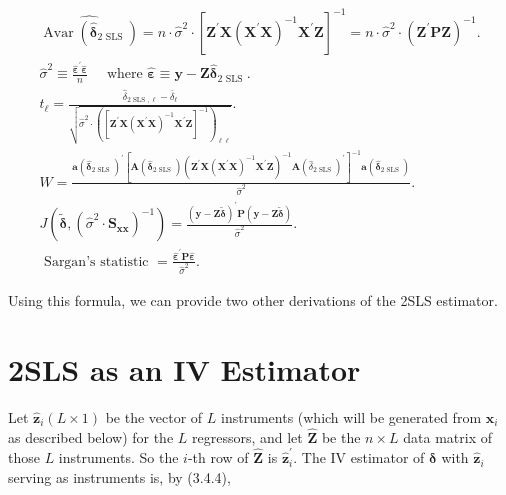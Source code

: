 \documentclass[10pt]{article}
\begin{document}
\begin{gather*}
\widehat{\operatorname{Avar}\left(\hat{\boldsymbol{\delta}}_{2 \text { SLS }}\right)}=n \cdot \hat{\sigma}^{2} \cdot\left[\mathbf{Z}^{\prime} \mathbf{X}\left(\mathbf{X}^{\prime} \mathbf{X}\right)^{-1} \mathbf{X}^{\prime} \mathbf{Z}\right]^{-1}=n \cdot \hat{\sigma}^{2} \cdot\left(\mathbf{Z}^{\prime} \mathbf{P} \mathbf{Z}\right)^{-1} .  \tag{3.8.5'}\\
\hat{\sigma}^{2} \equiv \frac{\hat{\boldsymbol{\varepsilon}}^{\prime} \hat{\boldsymbol{\varepsilon}}}{n} \quad \text { where } \hat{\boldsymbol{\varepsilon}} \equiv \mathbf{y}-\mathbf{Z} \hat{\boldsymbol{\delta}}_{2 \text { SLS }} .  \tag{$\prime$}\\
t_{\ell}=\frac{\hat{\delta}_{2 \text { SLS }, \ell}-\bar{\delta}_{\ell}}{\sqrt{\hat{\sigma}^{2} \cdot\left(\left[\mathbf{Z}^{\prime} \mathbf{X}\left(\mathbf{X}^{\prime} \mathbf{X}\right)^{-1} \mathbf{X}^{\prime} \mathbf{Z}\right]^{-1}\right)_{\ell \ell}}} .  \tag{$\prime$}\\
W=\frac{\mathbf{a}\left(\hat{\boldsymbol{\delta}}_{2 \text { SLS }}\right)^{\prime}\left[\mathbf{A}\left(\hat{\boldsymbol{\delta}}_{2 \text { SLS }}\right)\left(\mathbf{Z}^{\prime} \mathbf{X}\left(\mathbf{X}^{\prime} \mathbf{X}\right)^{-1} \mathbf{X}^{\prime} \mathbf{Z}\right)^{-1} \mathbf{A}\left(\hat{\delta}_{2 \text { SLS }}\right)^{\prime}\right]^{-1} \mathbf{a}\left(\hat{\boldsymbol{\delta}}_{2 \text { SLS }}\right)}{\hat{\sigma}^{2}} .  \tag{$\prime$}\\
J\left(\tilde{\boldsymbol{\delta}},\left(\hat{\sigma}^{2} \cdot \mathbf{S}_{\mathbf{x} \mathbf{x}}\right)^{-1}\right)=\frac{(\mathbf{y}-\mathbf{Z} \tilde{\boldsymbol{\delta}})^{\prime} \mathbf{P}(\mathbf{y}-\mathbf{Z} \tilde{\boldsymbol{\delta}})}{\hat{\sigma}^{2}} .  \tag{$\prime$}\\
\text { Sargan's statistic }=\frac{\hat{\boldsymbol{\varepsilon}}^{\prime} \mathbf{P} \hat{\boldsymbol{\varepsilon}}}{\hat{\sigma}^{2}} . \tag{3.8.10'}
\end{gather*}


Using this formula, we can provide two other derivations of the 2SLS estimator.

\section*{2SLS as an IV Estimator}
Let $\hat{\mathbf{z}}_{i}(L \times 1)$ be the vector of $L$ instruments (which will be generated from $\mathbf{x}_{i}$ as described below) for the $L$ regressors, and let $\widehat{\mathbf{Z}}$ be the $n \times L$ data matrix of those $L$ instruments. So the $i$-th row of $\widehat{\mathbf{Z}}$ is $\hat{\mathbf{z}}_{i}^{\prime}$. The IV estimator of $\boldsymbol{\delta}$ with $\hat{\mathbf{z}}_{i}$ serving as instruments is, by (3.4.4),
\end{document}
